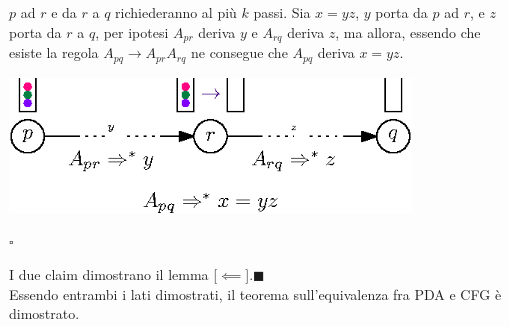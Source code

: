 \documentclass[10pt, letterpaper]{report}
\begin{document}
\begin{itemize}
\begin{itemize}
        $p$ ad $r$ e da $r$ a $q$ richiederanno al più $k$ passi. Sia $x=yz$, $y$ porta da  $p$ ad $r$, e 
        $z$ porta da $r$ a $q$, per ipotesi $A_{pr}$ deriva $y$ e $A_{rq}$ deriva $z$, 
        ma allora, essendo che esiste la regola $A_{pq}\longrightarrow A_{pr}A_{rq}$ ne consegue che 
        $A_{pq}$ deriva $x=yz$.\begin{center}
            \includegraphics[width=0.8\textwidth ]{images/dimoPDACFG2.eps}
        \end{center}
    \end{itemize}
    \hfill $\square$
\end{itemize}
I due claim dimostrano il lemma [$\impliedby$].\hfill $\blacksquare$\\
Essendo entrambi i lati dimostrati, il teorema sull'equivalenza fra PDA e CFG è dimostrato.
\end{document}
